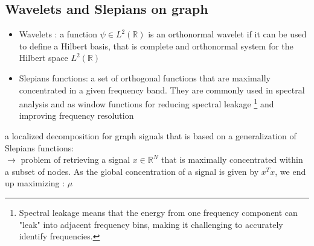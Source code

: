 \documentclass[12pt]{article}
\newcommand{\RR}{\mathbb{R}} %
\begin{document}
    \subsection{Wavelets and Slepians on graph}
    \begin{itemize}
        \item Wavelets : a function $\psi\in L^2(\RR)$ is an orthonormal wavelet if it can be used to define a Hilbert basis, that is complete and orthonormal system for the Hilbert space $L^2(\RR)$
        \item Slepians functions:  a set of orthogonal functions that are maximally concentrated in a given frequency band. They are commonly used in spectral analysis and as window functions for reducing spectral leakage \footnote{Spectral leakage means that the energy from one frequency component can "leak" into adjacent frequency bins, making it challenging to accurately identify frequencies.} and improving frequency resolution
    \end{itemize}
    a localized decomposition for graph signals that is based on a generalization of Slepians functions: \\
    $\rightarrow$ problem of retrieving a signal $x\in\RR^N$ that is maximally concentrated within a subset of nodes. As the global concentration of a signal is given by $x^Tx$, we end up maximizing : $\mu$
\end{document}
